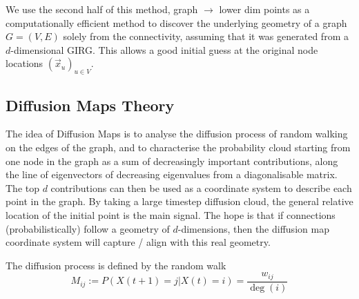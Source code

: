 We use the second half of this method, graph $\to$ lower dim points as a computationally efficient method to discover the underlying geometry of a graph $G = (V,E)$ solely from the connectivity, assuming that it was generated from a $d$-dimensional GIRG. This allows a good initial guess at the original node locations $(\vec{x}_u)_{u \in V}$.



\subsection{Diffusion Maps Theory}
\label{sec:diff_maps_theory}
The idea of Diffusion Maps is to analyse the diffusion process of random walking on the edges of the graph, and to characterise the probability cloud starting from one node in the graph as a sum of decreasingly important contributions, along the line of eigenvectors of decreasing eigenvalues from a diagonalisable matrix. The top $d$ contributions can then be used as a coordinate system to describe each point in the graph. By taking a large timestep diffusion cloud, the general relative location of the initial point is the main signal. The hope is that if connections (probabilistically) follow a geometry of $d$-dimensions, then the diffusion map coordinate system will capture / align with this real geometry.

The diffusion process is defined by the random walk 
\begin{equation}
  M_{ij} := P(X(t+1) = j | X(t)=i) = \frac{w_{ij}}{\deg(i)}
\end{equation}


